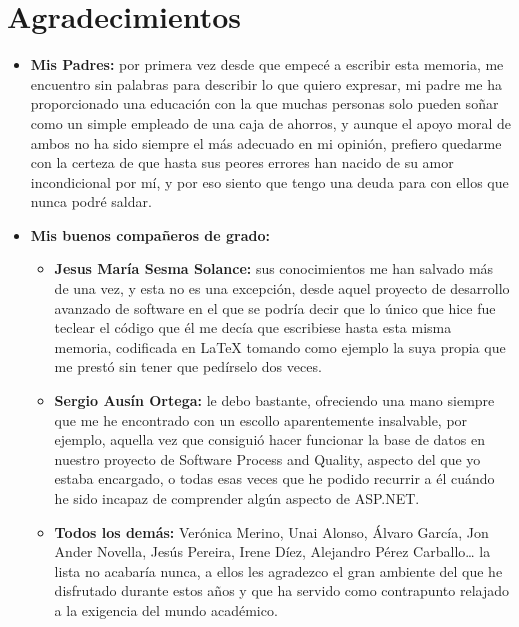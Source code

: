 \chapter*{Agradecimientos}

\begin{itemize}

\item \textbf{Mis Padres:} por primera vez desde que empecé a escribir esta memoria, me encuentro sin palabras para describir lo que quiero expresar, mi padre me ha proporcionado una educación con la que muchas personas solo pueden soñar como un simple empleado de una caja de ahorros, y aunque el apoyo moral de ambos no ha sido siempre el más adecuado en mi opinión, prefiero quedarme con la certeza de que hasta sus peores errores han nacido de su amor incondicional por mí, y por eso siento que tengo una deuda para con ellos que nunca podré saldar.

\item \textbf{Mis buenos compañeros de grado:}
\begin{itemize}
\item \textbf{Jesus María Sesma Solance:} sus conocimientos me han salvado más de una vez, y esta no es una excepción, desde aquel proyecto de desarrollo avanzado de software en el que se podría decir que lo único que hice fue teclear el código que él me decía que escribiese hasta esta misma memoria, codificada en LaTeX tomando como ejemplo la suya propia que me prestó sin tener que pedírselo dos veces.
\item \textbf{Sergio Ausín Ortega:}  le debo bastante, ofreciendo una mano siempre que me he encontrado con un escollo aparentemente insalvable, por ejemplo, aquella vez que consiguió hacer funcionar la base de datos en nuestro proyecto de Software Process and Quality, aspecto del que yo estaba encargado, o todas esas veces que he podido recurrir a él cuándo he sido incapaz de comprender algún aspecto de ASP.NET.
\item \textbf{Todos los demás:} Verónica Merino, Unai Alonso, Álvaro García, Jon Ander Novella, Jesús Pereira, Irene Díez, Alejandro Pérez Carballo… la lista no acabaría nunca, a ellos les agradezco el gran ambiente del que he disfrutado durante estos años y que ha servido como contrapunto relajado a la exigencia del mundo académico.
\end{itemize}


\end{itemize}
